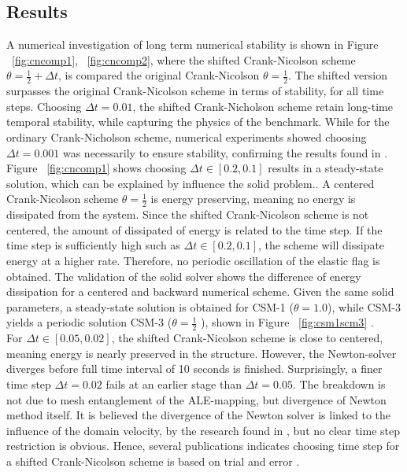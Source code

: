 \subsection{Results}
A numerical investigation of long term numerical stability is shown in Figure ~\ref{fig:cncomp1}, ~\ref{fig:cncomp2}, where the shifted Crank-Nicolson scheme $\theta = \frac{1}{2} + \Delta t$, is compared the original Crank-Nicolson $\theta = \frac{1}{2}$. The shifted version surpasses the original Crank-Nicolson scheme in terms of stability, for all time steps. Choosing $\Delta t = 0.01$, the shifted Crank-Nicholson scheme retain long-time temporal stability, while capturing the physics of the benchmark. While for the ordinary Crank-Nicholson scheme, numerical experiments showed choosing $\Delta t = 0.001$ was necessarily to ensure stability, confirming the results found in \cite{Wicka}.  \\
Figure ~\ref{fig:cncomp1} shows choosing $\Delta t \in [0.2, 0.1]$ results in a steady-state solution, which can be explained by influence the solid problem.. A centered Crank-Nicolson scheme $\theta= \frac{1}{2}$ is energy preserving, meaning no energy is dissipated from the system. Since the shifted Crank-Nicolson scheme is not centered, the amount of dissipated of energy is related to the time step. If the time step is sufficiently high such as $\Delta t \in [0.2, 0.1]$, the scheme will dissipate energy at a higher rate. Therefore, no periodic oscillation of the elastic flag is obtained. The validation of the solid solver shows the difference of energy dissipation for a centered and backward numerical scheme. Given the same solid parameters, a steady-state solution is obtained for CSM-1 ($\theta = 1.0 $), while CSM-3 yields a periodic solution CSM-3 ($\theta = \frac{1}{2}$ ), shown in Figure ~\ref{fig:csm1scm3} .\\
For $\Delta t \in [0.05, 0.02]$, the shifted Crank-Nicolson scheme is close to centered, meaning energy is nearly preserved in the structure. However, the Newton-solver diverges before full time interval of 10 seconds is finished. Surprisingly, a finer time step $\Delta t = 0.02$ fails at an earlier stage than $\Delta t = 0.05$. The breakdown is not due to mesh entanglement of the ALE-mapping, but divergence of Newton method itself\cite{Richter2015}. It is believed the divergence of the Newton solver is linked to the influence of the domain velocity, by the research found in \cite{Formaggia2004}, but no clear time step restriction is obvious. Hence, several publications indicates choosing time step for a shifted Crank-Nicolson scheme is based on trial and error \cite{Wicka, Wick2013a}. 
